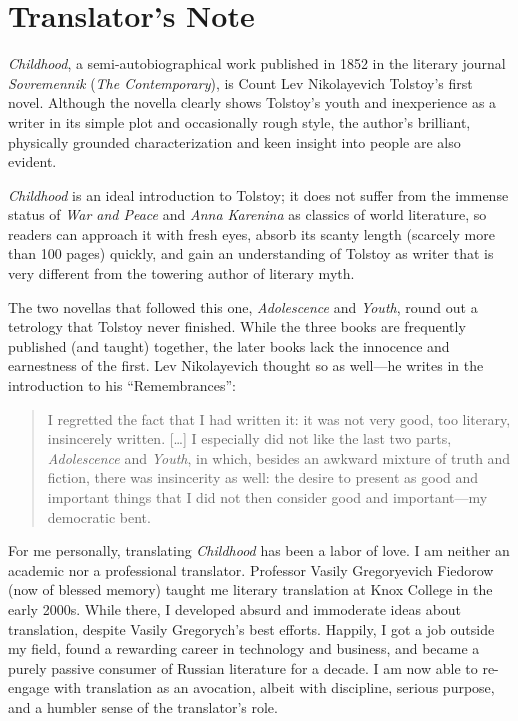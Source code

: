 \chapter{Translator's Note}

\textit{Childhood}, a semi-autobiographical work published in 1852 in the literary journal \textit{Sovremennik} (\textit{The Contemporary}), is Count Lev Nikolayevich Tolstoy's first novel. Although the novella clearly shows Tolstoy's youth and inexperience as a writer in its simple plot and occasionally rough style, the author's brilliant, physically grounded characterization and keen insight into people are also evident.

\textit{Childhood} is an ideal introduction to Tolstoy; it does not suffer from the immense status of \textit{War and Peace} and \textit{Anna Karenina} as classics of world literature, so readers can approach it with fresh eyes, absorb its scanty length (scarcely more than 100 pages) quickly, and gain an understanding of Tolstoy as writer that is very different from the towering author of literary myth.

The two novellas that followed this one, \textit{Adolescence} and \textit{Youth}, round out a tetrology that Tolstoy never finished. While the three books are frequently published (and taught) together, the later books lack the innocence and earnestness of the first. Lev Nikolayevich thought so as well---he writes in the introduction to his ``Remembrances'':

\begin{quotation}
I regretted the fact that I had written it: it was not very good, too literary, insincerely written. [\ldots{}] I especially did not like the last two parts, \textit{Adolescence} and \textit{Youth}, in which, besides an awkward mixture of truth and fiction, there was insincerity as well: the desire to present as good and important things that I did not then consider good and important---my democratic bent.
\end{quotation}

For me personally, translating \textit{Childhood} has been a labor of love. I am neither an academic nor a professional translator. Professor Vasily Gregoryevich Fiedorow (now of blessed memory) taught me literary translation at Knox College in the early 2000s. While there, I developed absurd and immoderate ideas about translation, despite Vasily Gregorych's best efforts. Happily, I got a job outside my field, found a rewarding career in technology and business, and became a purely passive consumer of Russian literature for a decade. I am now able to re-engage with translation as an avocation, albeit with discipline, serious purpose, and a humbler sense of the translator's role.

